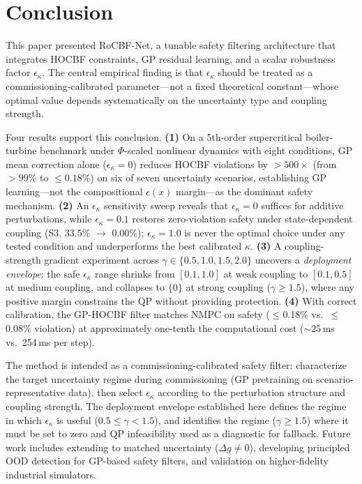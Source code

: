\section{Conclusion}

This paper presented RoCBF-Net, a tunable safety filtering architecture that integrates HOCBF constraints, GP residual learning, and a scalar robustness factor $\epsilon_\kappa$. The central empirical finding is that $\epsilon_\kappa$ should be treated as a commissioning-calibrated parameter---not a fixed theoretical constant---whose optimal value depends systematically on the uncertainty type and coupling strength.

Four results support this conclusion. \textbf{(1)} On a 5th-order supercritical boiler-turbine benchmark under $\Phi$-scaled nonlinear dynamics with eight conditions, GP mean correction alone ($\epsilon_\kappa=0$) reduces HOCBF violations by $>500\times$ (from $>99\%$ to $\leq0.18\%$) on six of seven uncertainty scenarios, establishing GP learning---not the compositional $\epsilon(x)$ margin---as the dominant safety mechanism. \textbf{(2)} An $\epsilon_\kappa$ sensitivity sweep reveals that $\epsilon_\kappa=0$ suffices for additive perturbations, while $\epsilon_\kappa=0.1$ restores zero-violation safety under state-dependent coupling (S3, 33.5\% $\to$ 0.00\%); $\epsilon_\kappa=1.0$ is never the optimal choice under any tested condition and underperforms the best calibrated $\kappa$. \textbf{(3)} A coupling-strength gradient experiment across $\gamma\in\{0.5,1.0,1.5,2.0\}$ uncovers a \emph{deployment envelope}: the safe $\epsilon_\kappa$ range shrinks from $[0.1,1.0]$ at weak coupling to $[0.1,0.5]$ at medium coupling, and collapses to $\{0\}$ at strong coupling ($\gamma\geq1.5$), where any positive margin constrains the QP without providing protection. \textbf{(4)} With correct calibration, the GP-HOCBF filter matches NMPC on safety ($\leq$0.18\% vs.\ $\leq$0.08\% violation) at approximately one-tenth the computational cost (${\sim}25$\,ms vs.\ 254\,ms per step).

The method is intended as a commissioning-calibrated safety filter: characterize the target uncertainty regime during commissioning (GP pretraining on scenario-representative data), then select $\epsilon_\kappa$ according to the perturbation structure and coupling strength. The deployment envelope established here defines the regime in which $\epsilon_\kappa$ is useful ($0.5\leq\gamma<1.5$), and identifies the regime ($\gamma\geq1.5$) where it must be set to zero and QP infeasibility used as a diagnostic for fallback. Future work includes extending to matched uncertainty ($\Delta g \neq 0$), developing principled OOD detection for GP-based safety filters, and validation on higher-fidelity industrial simulators.
